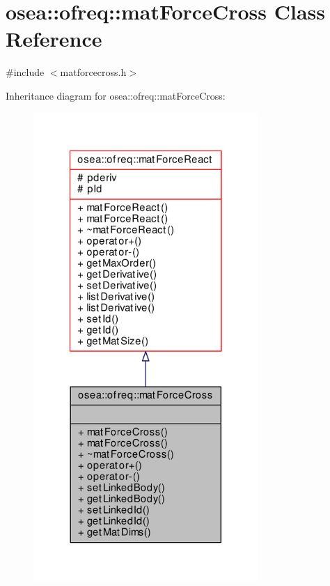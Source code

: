 \hypertarget{classosea_1_1ofreq_1_1mat_force_cross}{\section{osea\-:\-:ofreq\-:\-:mat\-Force\-Cross Class Reference}
\label{classosea_1_1ofreq_1_1mat_force_cross}
}


{\ttfamily \#include $<$matforcecross.\-h$>$}



Inheritance diagram for osea\-:\-:ofreq\-:\-:mat\-Force\-Cross\-:\nopagebreak
\begin{figure}[H]
\begin{center}
\leavevmode
\includegraphics[width=242pt]{classosea_1_1ofreq_1_1mat_force_cross__inherit__graph}
\end{center}
\end{figure}
